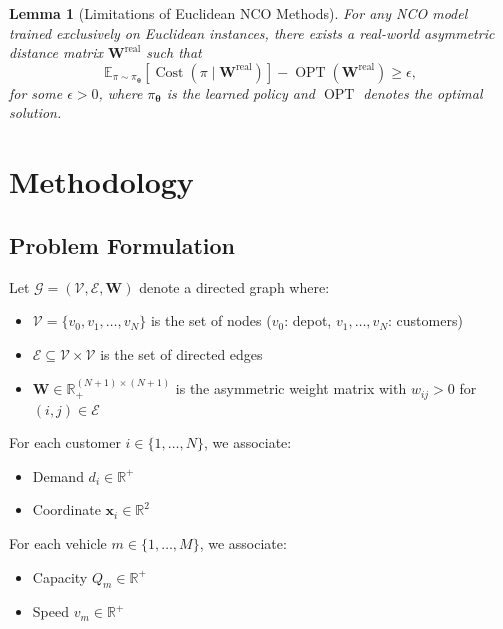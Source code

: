 \documentclass[journal,twoside,web]{ieeecolor}
\newtheorem{lemma}[theorem]{Lemma}
\theoremstyle{definition}
\theoremstyle{remark}
\theoremstyle{definition}
\begin{document}
\begin{lemma}[Limitations of Euclidean NCO Methods]
For any NCO model trained exclusively on Euclidean instances, there exists a real-world asymmetric distance matrix
$\mathbf{W}^{\mathrm{real}}$
such that
\begin{equation}
\mathbb{E}_{\pi \sim \pi_{\boldsymbol{\theta}}}
\!\left[
\operatorname{Cost}\!\left(\pi \mid \mathbf{W}^{\mathrm{real}}\right)
\right]
-
\operatorname{OPT}\!\left(\mathbf{W}^{\mathrm{real}}\right)
\ge
\epsilon,
\end{equation}
for some $\epsilon > 0$, where $\pi_{\boldsymbol{\theta}}$ is the learned policy and $\operatorname{OPT}$ denotes the optimal solution.
\end{lemma}

\section{Methodology}

\subsection{Problem Formulation}

Let $\mathcal{G} = (\mathcal{V}, \mathcal{E}, \mathbf{W})$ denote a directed graph where:
\begin{itemize}
    \item $\mathcal{V} = \{v_0, v_1, \ldots, v_N\}$ is the set of nodes ($v_0$: depot, $v_1, \ldots, v_N$: customers)
    \item $\mathcal{E} \subseteq \mathcal{V} \times \mathcal{V}$ is the set of directed edges
    \item $\mathbf{W} \in \mathbb{R}^{(N+1) \times (N+1)}_+$ is the asymmetric weight matrix with $w_{ij} > 0$ for $(i,j) \in \mathcal{E}$
\end{itemize}

For each customer $i \in \{1,\ldots,N\}$, we associate:
\begin{itemize}
    \item Demand $d_i \in \mathbb{R}^+$
    \item Coordinate $\mathbf{x}_i \in \mathbb{R}^2$
\end{itemize}

For each vehicle $m \in \{1,\ldots,M\}$, we associate:
\begin{itemize}
    \item Capacity $Q_m \in \mathbb{R}^+$
    \item Speed $v_m \in \mathbb{R}^+$
\end{itemize}
\end{document}
